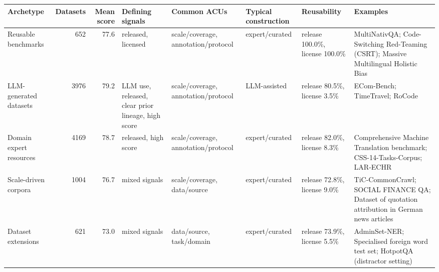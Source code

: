 \begin{tabular}{lrrlllll}
\toprule
Archetype & Datasets & Mean score & Defining signals & Common ACUs & Typical construction & Reusability & Examples \\
\midrule
Reusable benchmarks & 652 & 77.6 & released, licensed & scale/coverage, annotation/protocol & expert/curated & release 100.0\%, license 100.0\% & MultiNativQA; Code-Switching Red-Teaming (CSRT); Massive Multilingual Holistic Bias \\
LLM-generated datasets & 3976 & 79.2 & LLM use, released, clear prior lineage, high score & scale/coverage, annotation/protocol & LLM-assisted & release 80.5\%, license 3.5\% & ECom-Bench; TimeTravel; RoCode \\
Domain expert resources & 4169 & 78.7 & released, high score & scale/coverage, annotation/protocol & expert/curated & release 82.0\%, license 8.3\% & Comprehensive Machine Translation benchmark; CSS-14-Tasks-Corpus; LAR-ECHR \\
Scale-driven corpora & 1004 & 76.7 & mixed signals & scale/coverage, data/source & expert/curated & release 72.8\%, license 9.0\% & TiC-CommonCrawl; SOCIAL FINANCE QA; Dataset of quotation attribution in German news articles \\
Dataset extensions & 621 & 73.0 & mixed signals & data/source, task/domain & expert/curated & release 73.9\%, license 5.5\% & AdminSet-NER; Specialised foreign word test set; HotpotQA (distractor setting) \\
\bottomrule
\end{tabular}

